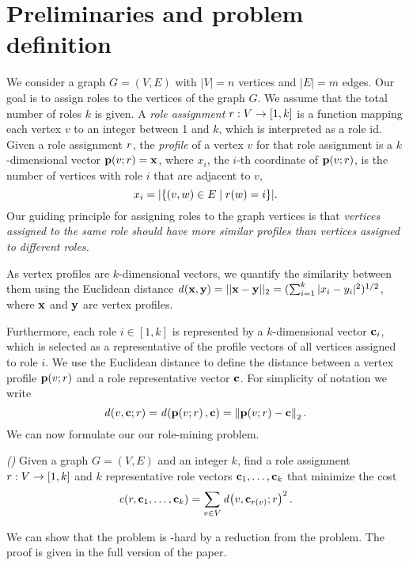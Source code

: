 \section{Preliminaries and problem definition}
\label{sec:prel}

We consider a graph $G = (V, E)$ 
with $|V|=n$ vertices and $|E|=m$ edges. 
Our goal is to assign roles to the vertices of the graph $G$.
We assume that the total number of roles $k$ is given.
A \emph{role assignment} 
${r}:{V} \to {[1, k]}$ is a function mapping each vertex $v$ to an integer between 1 and $k$, 
which is interpreted as a role id. 
Given a role assignment $r$, 
the \emph{profile} of a vertex $v$ for that role assignment 
is a $k$-dimensional vector $\prof{v; \role} = \vect{x}$, 
where $x_i$, the $i$-th coordinate of $\prof{v; \role}$, 
is the number of vertices with role $i$ that are adjacent to $v$,
\[
	x_i = {\left|\left\{(v, w) \in E \mid r(w) = i\right\}\right|}.
\]
Our guiding principle for assigning roles to the graph vertices is that
\emph{vertices assigned to the same role should have more similar
profiles than vertices assigned to different roles.}

As vertex profiles are $k$-dimensional vectors, 
we quantify the similarity between them using the Euclidean distance 
$\dist{\vect{x},\vect{y}} = || \vect{x}-\vect{y} ||_2 = 
(\sum_{i=1}^k |x_i-y_i|^2)^{1/2}$, 
where $\mathbf{x}$ and $\mathbf{y}$ are vertex profiles.

Furthermore, each role $i\in[1,k]$ is represented by a $k$-dimensional vector $\mathbf{c}_i$, 
which is selected as a representative of the profile vectors of all vertices assigned to role $i$.
We use the Euclidean distance to define the distance between 
a vertex profile $\prof{v; \role}$ 
and a role representative vector $\mathbf{c}$.
For simplicity of notation we write 
\[
\dist{v, \centroid; \role} = 
\dist{\prof{v; \role},\centroid} = 
\norm{\prof{v; \role} - \centroid}_2.
\]
We can now formulate our our role-mining problem.

\begin{problem}
\label{problem:role-mining}
\emph{(\prbrm)}
Given a graph $G = (V, E)$ and an integer $k$, 
find a role assignment ${r}:{V} \to {[1, k]}$ and 
$k$ representative role vectors $\mathbf{c}_1, \ldots, \mathbf{c}_k$
that minimize the cost
\[
\cost{\role, \centroid_1, \ldots, \centroid_k} = 
\sum_{v \in V} \dist{v, \centroid_{\role(v)}; \role}^2.
\]
\end{problem}

We can show that the \prbrm problem is  \np-hard
by a reduction from the \tmatch problem.
The proof is given in the full version of the paper.

